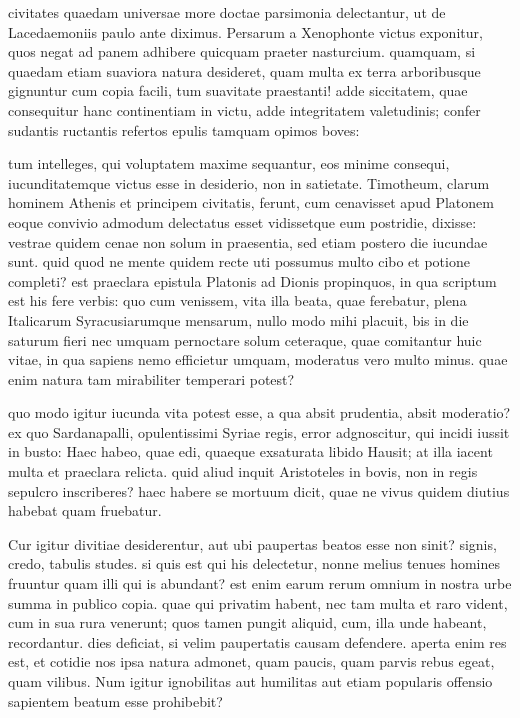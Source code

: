  civitates quaedam universae more doctae parsimonia delectantur, ut de Lacedaemoniis paulo ante diximus. Persarum a Xenophonte victus exponitur, quos negat ad panem adhibere quicquam praeter nasturcium. quamquam, si quaedam etiam suaviora natura desideret, quam multa ex terra arboribusque gignuntur cum copia facili, tum suavitate praestanti! adde siccitatem, quae consequitur hanc continentiam in victu, adde integritatem valetudinis; confer sudantis ructantis refertos epulis tamquam opimos boves:

 tum intelleges, qui voluptatem maxime sequantur, eos minime consequi, iucunditatemque victus esse in desiderio, non in satietate. Timotheum, clarum hominem Athenis et principem civitatis, ferunt, cum cenavisset apud Platonem eoque convivio admodum delectatus esset vidissetque eum postridie, dixisse: vestrae quidem cenae non solum in praesentia, sed etiam postero die iucundae sunt. quid quod ne mente quidem recte uti possumus multo cibo et potione completi? est praeclara epistula Platonis ad Dionis propinquos, in qua scriptum est his fere verbis: quo cum venissem, vita illa beata, quae ferebatur, plena Italicarum Syracusiarumque mensarum, nullo modo mihi placuit, bis in die saturum fieri nec umquam pernoctare solum ceteraque, quae comitantur huic vitae, in qua sapiens nemo efficietur umquam, moderatus vero multo minus. quae enim natura tam mirabiliter temperari potest?

 quo modo igitur iucunda vita potest esse, a qua absit prudentia, absit moderatio? ex quo Sardanapalli, opulentissimi Syriae regis, error adgnoscitur, qui incidi iussit in busto: Haec habeo, quae edi, quaeque exsaturata libido Hausit; at illa iacent multa et praeclara relicta. quid aliud inquit Aristoteles in bovis, non in regis sepulcro inscriberes? haec habere se mortuum dicit, quae ne vivus quidem diutius habebat quam fruebatur.

 Cur igitur divitiae desiderentur, aut ubi paupertas beatos esse non sinit? signis, credo, tabulis studes. si quis est qui his delectetur, nonne melius tenues homines fruuntur quam illi qui is abundant? est enim earum rerum omnium in nostra urbe summa in publico copia. quae qui privatim habent, nec tam multa et raro vident, cum in sua rura venerunt; quos tamen pungit aliquid, cum, illa unde habeant, recordantur. dies deficiat, si velim paupertatis causam defendere. aperta enim res est, et cotidie nos ipsa natura admonet, quam paucis, quam parvis rebus egeat, quam vilibus. Num igitur ignobilitas aut humilitas aut etiam popularis offensio sapientem beatum esse prohibebit?

